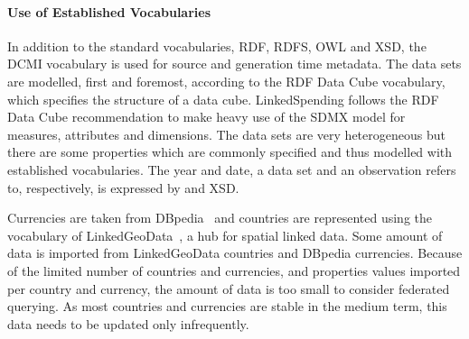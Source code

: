 \documentclass[sw]{iosart2x}
\begin{document}
\paragraph{Use of Established Vocabularies}
In addition to the standard vocabularies, RDF, RDFS, OWL and XSD, the DCMI vocabulary is used for source and generation time metadata.
The data sets are modelled, first and foremost, according to the RDF Data Cube vocabulary, %
which specifies the structure of a data cube.
LinkedSpending follows the RDF Data Cube recommendation to make heavy use of the SDMX model for measures, attributes and dimensions.%
The data sets are very heterogeneous but there are some properties which are commonly specified and thus modelled with established vocabularies.
The year and date, a data set and an observation refers to, respectively, is expressed by  and XSD.

Currencies are taken from DBpedia~\cite{dbpedia-swj} and countries are represented using the vocabulary of LinkedGeoData~\cite{SLHA11}, a hub for spatial linked data.
Some amount of data is imported from LinkedGeoData countries and DBpedia currencies. Because of the limited number of countries and currencies, and properties values imported per country and currency, the amount of data is too small to consider federated querying.
As most countries and currencies are stable in the medium term, this data needs to be updated only infrequently.
\end{document}
